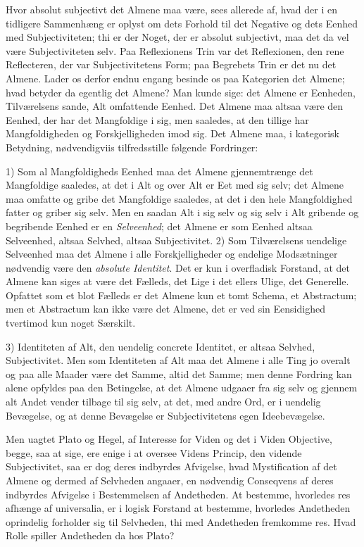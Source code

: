 \documentclass[12pt]{book}
\newcommand{\opage}[1]{\marginnote{\footnotesize\textit{[#1]}}}
\begin{document}
Hvor absolut subjectivt det Almene maa være, sees allerede af, hvad der i en tidligere
Sammenhæng er oplyst om dets Forhold til det Negative og dets Eenhed med Subjectiviteten; thi er
der Noget, der er absolut subjectivt, maa det da vel være Subjectiviteten selv. Paa Reflexionens
Trin var det Reflexionen, den rene Reflecteren, der var Subjectivitetens Form; paa Begrebets Trin
er det nu det Almene. Lader os derfor endnu engang besinde os paa Kategorien det Almene; hvad
betyder da egentlig det Almene? Man kunde sige: det Almene er Eenheden, Tilværelsens sande, Alt
omfattende Eenhed. Det Almene maa altsaa være den Eenhed, der har det Mangfoldige i sig, men
saaledes, at den tillige har Mangfoldigheden og Forskjelligheden imod sig. Det Almene maa, i
kategorisk Betydning, nødvendigviis tilfredsstille følgende Fordringer:

1) Som al Mangfoldigheds Eenhed maa det Almene gjennemtrænge det Mangfoldige saaledes, at det i
Alt og over Alt er Eet med sig selv; det Almene maa omfatte og gribe det Mangfoldige saaledes, at
det i den hele Mangfoldighed fatter og griber sig selv. Men en saadan Alt i sig selv og sig selv
i Alt gribende og begribende Eenhed er en \emph{Selveenhed}; det Almene er som Eenhed altsaa
Selveenhed, altsaa Selvhed, altsaa Subjectivitet.
\opage{182} 2) Som Tilværelsens uendelige Selveenhed maa det Almene i alle Forskjelligheder og endelige
Modsætninger nødvendig være den \emph{absolute Identitet}. Det er kun i overfladisk Forstand, at
det Almene kan siges at være det Fælleds, det Lige i det ellers Ulige, det Generelle. Opfattet som
et blot Fælleds er det Almene kun et tomt Schema, et Abstractum; men et Abstractum kan ikke være
det Almene, det er ved sin Eensidighed tvertimod kun noget Særskilt.

3) Identiteten af Alt, den uendelig concrete Identitet, er altsaa Selvhed, Subjectivitet. Men som
Identiteten af Alt maa det Almene i alle Ting jo overalt og paa alle Maader være det Samme, altid
det Samme; men denne Fordring kan alene opfyldes paa den Betingelse, at det Almene udgaaer fra sig
selv og gjennem alt Andet vender tilbage til sig selv, at det, med andre Ord, er i uendelig
Bevægelse, og at denne Bevægelse er Subjectivitetens egen Ideebevægelse.

Men uagtet Plato og Hegel, af Interesse for Viden og det i Viden Objective, begge, saa at sige,
ere enige i at oversee Videns Princip, den vidende Subjectivitet, saa er dog deres indbyrdes
Afvigelse, hvad Mystification af det Almene og dermed af Selvheden angaaer, en nødvendig
Conseqvens af deres indbyrdes Afvigelse i Bestemmelsen af Andetheden. At bestemme, hvorledes res
afhænge af universalia, er i logisk Forstand at bestemme, hvorledes Andetheden oprindelig
forholder sig til Selvheden, thi med Andetheden fremkomme res. Hvad Rolle spiller Andetheden da
hos Plato?
\end{document}
